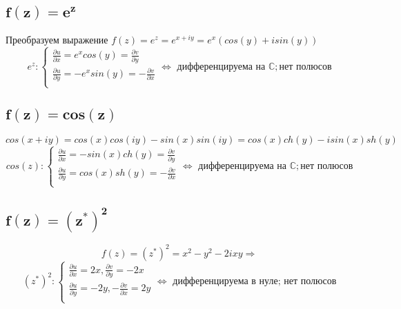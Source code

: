 \documentclass[12pt]{article}
\begin{document}
\subsection*{$\mathbf{f(z) = e^z}$}
Преобразуем выражение $f(z) = e^z = e^{x+iy} = e^x(cos(y)+isin(y))$
\begin{equation*}
e^z:
\begin{cases}
\frac{\partial u}{\partial x} = e^x cos(y) = \frac{\partial v}{\partial y} \\
\frac{\partial u}{\partial y} = -e^x sin(y) = -\frac{\partial v}{\partial x} \\
\end{cases}
\Leftrightarrow
\text{ дифференцируема на } \mathbb{C} ; \text{нет полюсов}
\end{equation*}
\subsection*{$\mathbf{f(z) = cos(z)}$}
$$cos(x+iy) = cos(x)cos(iy)-sin(x)sin(iy) = cos(x)ch(y)-i sin(x)sh(y)$$
\begin{equation*}
cos(z):
\begin{cases}
\frac{\partial u}{\partial x} = -sin(x)ch(y) = \frac{\partial v}{\partial y} \\
\frac{\partial u}{\partial y} = cos(x)sh(y) = -\frac{\partial v}{\partial x} \\
\end{cases}
\Leftrightarrow
\text{ дифференцируема на } \mathbb{C} ; \text{нет полюсов}
\end{equation*}
\subsection*{$\mathbf{f(z) = (z^*)^{2}}$}
\[f(z) = (z^*)^{2} = x^2-y^2 - 2ixy \Rightarrow\]
\begin{equation*}
(z^*)^{2}:
\begin{cases}
\frac{\partial u}{\partial x} = 2x, \frac{\partial v}{\partial y}=-2x \\
\frac{\partial u}{\partial y} = -2y, -\frac{\partial v}{\partial x}=2y \\
\end{cases}
\Leftrightarrow
\text{ дифференцируема в нуле; нет полюсов}
\end{equation*}
\end{document}

